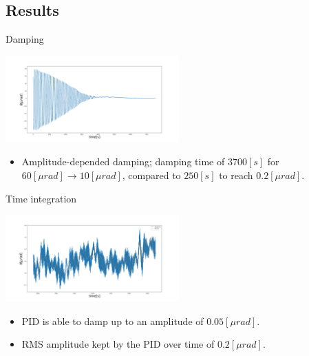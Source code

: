 \documentclass{beamer}
\begin{document}
\subsection{Results}
\begin{frame}{Damping}
	\begin{center}		
		\includegraphics[width=0.5\textwidth,keepaspectratio]{measured oscillation angle.png}
	\end{center}
	\begin{itemize}	
		
		\item Amplitude-depended damping; damping time of $3700[s]$ for $ 60 [\mu rad] \rightarrow 10[\mu rad] $, compared to $250[s]$ to reach $ 0.2[\mu rad]$.
						
	\end{itemize}
\end{frame}
\begin{frame}{Time integration}
	\begin{center}		
		\includegraphics[width=0.5\textwidth,keepaspectratio]{measured oscillation angle1.png}
	\end{center}
	\begin{itemize}	
		\item PID is able to damp up to an amplitude of $0.05[\mu rad]$.
		\item RMS amplitude kept by the PID over time of $ 0.2 [\mu rad]$.	
		
						
	\end{itemize}
\end{frame}
\end{document}
